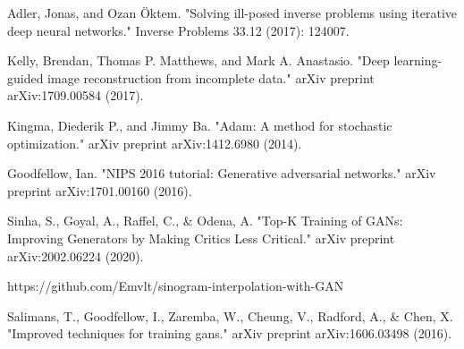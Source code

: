 \begin{thebibliography}{00}
Adler, Jonas, and Ozan Öktem. "Solving ill-posed inverse problems using iterative deep neural networks." Inverse Problems 33.12 (2017): 124007.

Kelly, Brendan, Thomas P. Matthews, and Mark A. Anastasio. "Deep learning-guided image reconstruction from incomplete data." arXiv preprint arXiv:1709.00584 (2017).

Kingma, Diederik P., and Jimmy Ba. "Adam: A method for stochastic optimization." arXiv preprint arXiv:1412.6980 (2014).

Goodfellow, Ian. "NIPS 2016 tutorial: Generative adversarial networks." arXiv preprint arXiv:1701.00160 (2016).

Sinha, S., Goyal, A., Raffel, C., \& Odena, A.  "Top-K Training of GANs: Improving Generators by Making Critics Less Critical." arXiv preprint arXiv:2002.06224 (2020).

 https://github.com/Emvlt/sinogram-interpolation-with-GAN

Salimans, T., Goodfellow, I., Zaremba, W., Cheung, V., Radford, A., \& Chen, X. "Improved techniques for training gans." arXiv preprint arXiv:1606.03498 (2016).

\end{thebibliography}